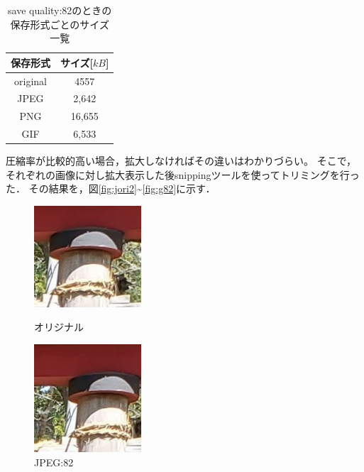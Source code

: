 \documentclass[a4paper,11pt]{bxjsarticle}
\begin{document}
    \begin{table}[htb]
      \begin{center}
        \caption{save quality:82のときの保存形式ごとのサイズ一覧}
        \begin{tabular}{|c|c|} \hline
          保存形式 & サイズ[$kB$] \\\hline
          original & 4557 \\ 
          JPEG & 2,642  \\
          PNG & 16,655  \\ 
          GIF & 6,533  \\ \hline
 
        \end{tabular}
        \label{tab:result_filesize}
      \end{center}
    \end{table}

    圧縮率が比較的高い場合，拡大しなければその違いはわかりづらい。
    そこで，それぞれの画像に対し拡大表示した後snippingツールを使ってトリミングを行った．
    その結果を，図\ref{fig:jori2}\textasciitilde\ref{fig:g82}に示す．

    \begin{figure}[htbp]
      \begin{minipage}{0.5\hsize}
       \begin{center}
        \includegraphics[width=40mm]{sample_tri2.jpg}
       \end{center}
       \caption{オリジナル}
       \label{fig:jori2}
      \end{minipage}
      \begin{minipage}{0.5\hsize}
       \begin{center}
        \includegraphics[width=40mm]{sample_j82_tri.jpg}
       \end{center}
       \caption{JPEG:82}
       \label{fig:j82}
      \end{minipage}
     \end{figure}
\end{document}
